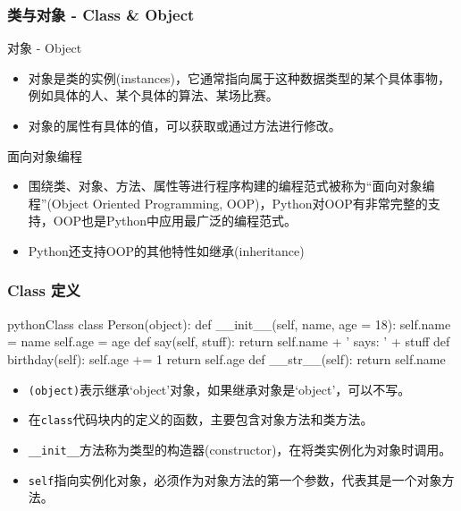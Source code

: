 \documentclass[9pt]{beamer}
\begin{document}
\begin{frame}
    \frametitle{类与对象 - Class \& Object}

    \begin{block}{对象 - Object}
    \begin{itemize}
        \item 对象是类的实例(instances)，它通常指向属于这种数据类型的某个具体事物，例如具体的人、某个具体的算法、某场比赛。
        \item 对象的属性有具体的值，可以获取或通过方法进行修改。
    \end{itemize}

    \end{block}
    \begin{block}{面向对象编程}

        \begin{itemize}
        \item  围绕类、对象、方法、属性等进行程序构建的编程范式被称为``面向对象编程''(Object Oriented Programming, OOP)，Python对OOP有非常完整的支持，OOP也是Python中应用最广泛的编程范式。
        \item Python还支持OOP的其他特性如继承(inheritance)
        \end{itemize}

        
    \end{block}


    

\end{frame}


\begin{frame}[fragile]
    \frametitle{Class 定义}

\begin{codebox}{python}{Class}
class Person(object):
    def __init__(self, name, age = 18):
        self.name = name
        self.age = age
    def say(self, stuff):
        return self.name + ' says: ' + stuff
    def birthday(self):
        self.age += 1
        return self.age
    def __str__(self):
        return self.name
\end{codebox}

\pause
\begin{itemize}
    \item \texttt{(object)}表示继承`object'对象，如果继承对象是`object'，可以不写。
    \item 在\texttt{class}代码块内的定义的函数，主要包含\alert{对象方法}和\alert{类方法}。
    \item \texttt{__init__}方法称为类型的构造器(constructor)，在将类实例化为对象时调用。
    \item \texttt{self}指向实例化对象，必须作为对象方法的第一个参数，代表其是一个对象方法。
\end{itemize}
    

\end{frame}
\end{document}

